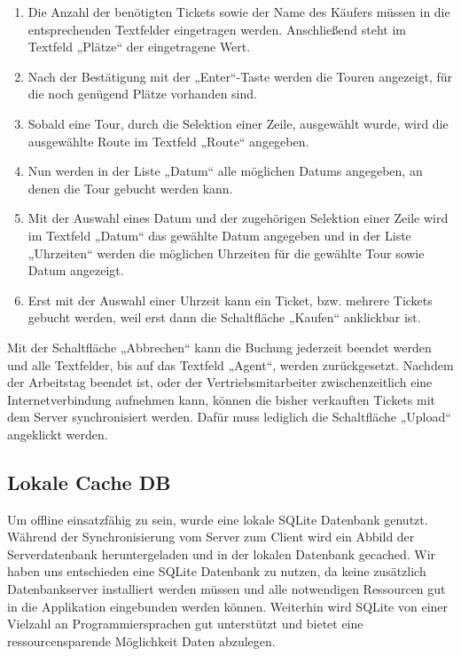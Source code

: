 \documentclass[12pt,a4paper,ngerman,english]{report}
\begin{document}
\begin{enumerate}
\item Die Anzahl der benötigten Tickets sowie der Name des Käufers müssen in die entsprechenden Textfelder eingetragen werden. Anschließend steht im Textfeld „Plätze“ der eingetragene Wert.
\item Nach der Bestätigung mit der „Enter“-Taste werden die Touren angezeigt, für die noch genügend Plätze vorhanden sind.
\item Sobald eine Tour, durch die Selektion einer Zeile, ausgewählt wurde, wird die ausgewählte Route im Textfeld „Route“ angegeben.
\item Nun werden in der Liste „Datum“ alle möglichen Datums angegeben, an denen die Tour gebucht werden kann.
\item Mit der Auswahl eines Datum und der zugehörigen Selektion einer Zeile wird im Textfeld „Datum“ das gewählte Datum angegeben und in der Liste „Uhrzeiten“ werden die möglichen Uhrzeiten für die gewählte Tour sowie Datum angezeigt.
\item Erst mit der Auswahl einer Uhrzeit kann ein Ticket, bzw. mehrere Tickets gebucht werden, weil erst dann die Schaltfläche „Kaufen“ anklickbar ist.
\end{enumerate}
Mit der Schaltfläche „Abbrechen“ kann die Buchung jederzeit beendet werden und alle Textfelder, bis auf das Textfeld „Agent“, werden zurückgesetzt. Nachdem der Arbeitstag beendet ist, oder der Vertriebsmitarbeiter zwischenzeitlich eine Internetverbindung aufnehmen kann, können die bisher verkauften Tickets mit dem Server synchronisiert werden. Dafür muss lediglich die Schaltfläche „Upload“ angeklickt werden.\\


\subsection{Lokale Cache DB}
Um offline einsatzfähig zu sein, wurde eine lokale SQLite Datenbank genutzt. Während der Synchronisierung vom Server zum Client wird ein Abbild der Serverdatenbank heruntergeladen und in der lokalen Datenbank gecached. Wir haben uns entschieden eine SQLite Datenbank zu nutzen, da keine zusätzlich Datenbankserver installiert werden müssen und alle notwendigen Ressourcen gut in die Applikation eingebunden werden können. Weiterhin wird SQLite von einer Vielzahl an Programmiersprachen gut unterstützt und bietet eine ressourcensparende Möglichkeit Daten abzulegen. \\
\end{document}
